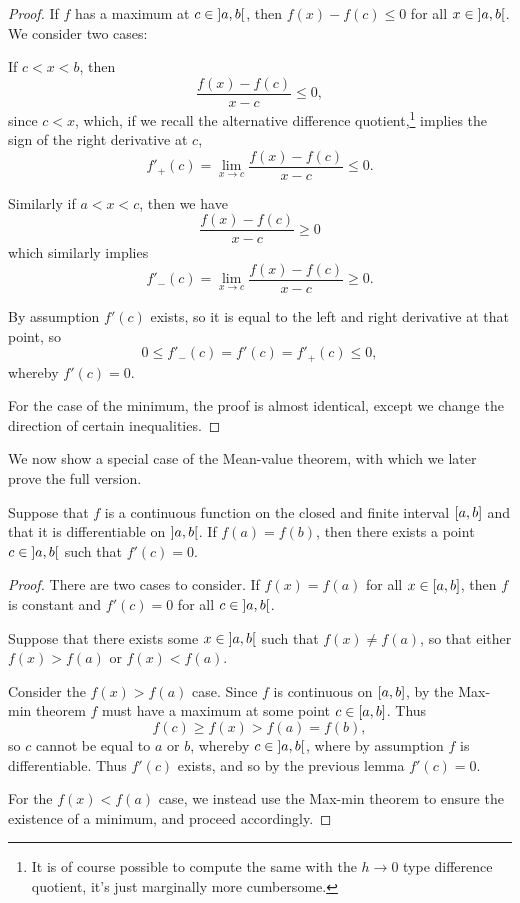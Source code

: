 \begin{proof}
	If $f$ has a maximum at $c \in \interval[open]{a}{b}$, then $f(x) - f(c) \leq 0$ for all $x \in \interval[open]{a}{b}$.
	We consider two cases:

	 If $c < x < b$, then
	\[
		\frac{f(x) - f(c)}{x - c} \leq 0,
	\]
	since $c < x$, which, if we recall the alternative difference quotient,\footnote{It is of course possible to compute the same with the $h \to 0$ type difference quotient, it's just marginally more cumbersome.} implies the sign of the right derivative at $c$,
	\[
		f'_+(c) = \lim_{x \to c} \frac{f(x) - f(c)}{x - c} \leq 0.
	\]

	\noindent
	 Similarly if $a < x < c$, then we have
	\[
		\frac{f(x) - f(c)}{x - c} \geq 0
	\]
	which similarly implies
	\[
		f'_-(c) = \lim_{x \to c} \frac{f(x) - f(c)}{x - c} \geq 0.
	\]

	\noindent
	By assumption $f'(c)$ exists, so it is equal to the left and right derivative at that point, so
	\[
		0 \leq f'_-(c) = f'(c) = f'_+(c) \leq 0,
	\]
	whereby $f'(c) = 0$.

	For the case of the minimum, the proof is almost identical, except we change the direction of certain inequalities.
\end{proof}

\noindent
We now show a special case of the Mean-value theorem, with which we later prove the full version.

\begin{theorem}
	Suppose that $f$ is a continuous function on the closed and finite interval $\interval{a}{b}$ and that it is differentiable on $\interval[open]{a}{b}$.
	If $f(a) = f(b)$, then there exists a point $c \in \interval[open]{a}{b}$ such that $f'(c) = 0$.
\end{theorem}

\begin{proof}
	There are two cases to consider.
	If $f(x) = f(a)$ for all $x \in \interval{a}{b}$, then $f$ is constant and $f'(c) = 0$ for all $c \in \interval[open]{a}{b}$.

	Suppose that there exists some $x \in\interval[open]{a}{b}$ such that $f(x) \neq f(a)$, so that either $f(x) > f(a)$ or $f(x) < f(a)$.

	Consider the $f(x) > f(a)$ case.
	Since $f$ is continuous on $\interval{a}{b}$, by the Max-min theorem $f$ must have a maximum at some point $c \in \interval{a}{b}$.
	Thus
	\[
		f(c) \geq f(x) > f(a) = f(b),
	\]
	so $c$ cannot be equal to $a$ or $b$, whereby $c \in \interval[open]{a}{b}$, where by assumption $f$ is differentiable.
	Thus $f'(c)$ exists, and so by the previous lemma $f'(c) = 0$.

	For the $f(x) < f(a)$ case, we instead use the Max-min theorem to ensure the existence of a minimum, and proceed accordingly.
\end{proof}

